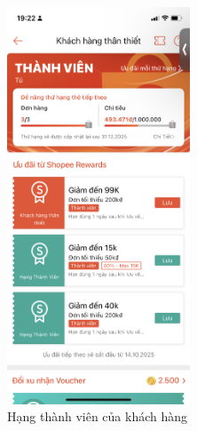 \begin{figure}[H]
    \centering
    \begin{subfigure}[b]{0.4\textwidth}
        \centering
        \includegraphics[width=0.6\textwidth]{Hạng_thành_viên1.PNG}
        \caption{Hạng thành viên của khách hàng}
    \end{subfigure}
    \hfill
    \begin{subfigure}[b]{0.4\textwidth}
        \centering

\end{subfigure}
\end{figure}
